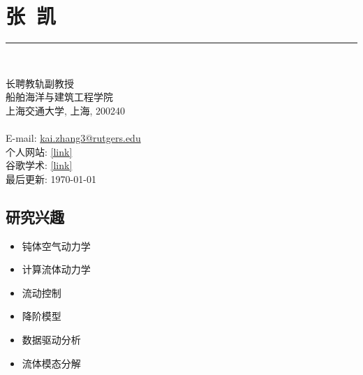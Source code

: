 \documentclass[10pt]{article}
\newenvironment{myitemize}
{ \begin{itemize}
    \setlength{\itemsep}{0pt}
    \setlength{\parskip}{0pt}
    \setlength{\parsep}{0pt}     }
{ \end{itemize}                  }
\begin{document}
\section*{{\Large 张~凯}} 
\vspace{+0.15in}

\vspace{-0.34in}
\begin{center}
\rule{\textwidth}{0.5pt}
\end{center}
\vspace{-0.57in}
~\\
\begin{multicols}{2}
\noindent 长聘教轨副教授\\ 
船舶海洋与建筑工程学院\\
上海交通大学, 上海, 200240\\
~\\
E-mail: \href{kai.zhang3@rutgers.edu}{kai.zhang3@rutgers.edu}\\
个人网站: \href{}{[link]} \\
谷歌学术: \href{https://scholar.google.com/citations?user=xQ9TdtgAAAAJ&hl=en}{[link]}\\
\null\hfill {\scriptsize 最后更新: \today}
\end{multicols}

\subsection*{研究兴趣}

\begin{multicols}{2}
\begin{myitemize}
\item 钝体空气动力学
\item 计算流体动力学
\item 流动控制
\item 降阶模型
\item 数据驱动分析
\item 流体模态分解


\end{myitemize}
\end{multicols}
\end{document}
